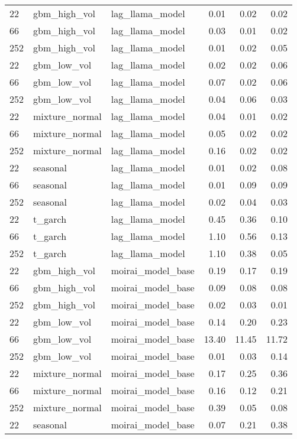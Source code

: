 {\begin{tabular}{lllrrr}
\midrule
22 & gbm\_high\_vol & lag\_llama\_model & 0.01 & 0.02 & 0.02 \\
66 & gbm\_high\_vol & lag\_llama\_model & 0.03 & 0.01 & 0.02 \\
252 & gbm\_high\_vol & lag\_llama\_model & 0.01 & 0.02 & 0.05 \\
\midrule
22 & gbm\_low\_vol & lag\_llama\_model & 0.02 & 0.02 & 0.06 \\
66 & gbm\_low\_vol & lag\_llama\_model & 0.07 & 0.02 & 0.06 \\
252 & gbm\_low\_vol & lag\_llama\_model & 0.04 & 0.06 & 0.03 \\
\midrule
22 & mixture\_normal & lag\_llama\_model & 0.04 & 0.01 & 0.02 \\
66 & mixture\_normal & lag\_llama\_model & 0.05 & 0.02 & 0.02 \\
252 & mixture\_normal & lag\_llama\_model & 0.16 & 0.02 & 0.02 \\
\midrule
22 & seasonal & lag\_llama\_model & 0.01 & 0.02 & 0.08 \\
66 & seasonal & lag\_llama\_model & 0.01 & 0.09 & 0.09 \\
252 & seasonal & lag\_llama\_model & 0.02 & 0.04 & 0.03 \\
\midrule
22 & t\_garch & lag\_llama\_model & 0.45 & 0.36 & 0.10 \\
66 & t\_garch & lag\_llama\_model & 1.10 & 0.56 & 0.13 \\
252 & t\_garch & lag\_llama\_model & 1.10 & 0.38 & 0.05 \\
\midrule
22 & gbm\_high\_vol & moirai\_model\_base & 0.19 & 0.17 & 0.19 \\
66 & gbm\_high\_vol & moirai\_model\_base & 0.09 & 0.08 & 0.08 \\
252 & gbm\_high\_vol & moirai\_model\_base & 0.02 & 0.03 & 0.01 \\
\midrule
22 & gbm\_low\_vol & moirai\_model\_base & 0.14 & 0.20 & 0.23 \\
66 & gbm\_low\_vol & moirai\_model\_base & 13.40 & 11.45 & 11.72 \\
252 & gbm\_low\_vol & moirai\_model\_base & 0.01 & 0.03 & 0.14 \\
\midrule
22 & mixture\_normal & moirai\_model\_base & 0.17 & 0.25 & 0.36 \\
66 & mixture\_normal & moirai\_model\_base & 0.16 & 0.12 & 0.21 \\
252 & mixture\_normal & moirai\_model\_base & 0.39 & 0.05 & 0.08 \\
\midrule
22 & seasonal & moirai\_model\_base & 0.07 & 0.21 & 0.38 \\

\end{tabular}}
